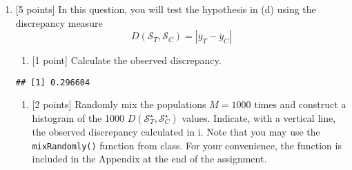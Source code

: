 \documentclass[
]{article}
\newenvironment{Shaded}{\begin{snugshade}}{\end{snugshade}}
\newcommand{\FunctionTok}[1]{\textcolor[rgb]{0.13,0.29,0.53}{\textbf{#1}}}
\newcommand{\NormalTok}[1]{#1}
\newcommand{\OtherTok}[1]{\textcolor[rgb]{0.56,0.35,0.01}{#1}}
\newcommand{\SpecialCharTok}[1]{\textcolor[rgb]{0.81,0.36,0.00}{\textbf{#1}}}
\newcommand{\StringTok}[1]{\textcolor[rgb]{0.31,0.60,0.02}{#1}}
\providecommand{\tightlist}{%
  \setlength{\itemsep}{0pt}\setlength{\parskip}{0pt}}
\begin{document}
\begin{enumerate}
\def\labelenumi{(\alph{enumi})}
\setcounter{enumi}{4}
\item
  {[}5 points{]} In this question, you will test the hypothesis in (d)
  using the discrepancy measure
  \[D(\mathcal{S}_{T},\mathcal{S}_{C}) = |\overline{y}_T - \overline{y}_C|\]

  \begin{enumerate}
  \def\labelenumii{\roman{enumii}.}
  \tightlist
  \item
    {[}1 point{]} Calculate the observed discrepancy.
  \end{enumerate}

\begin{Shaded}
\end{Shaded}

\begin{verbatim}
## [1] 0.296604
\end{verbatim}

  \begin{enumerate}
  \def\labelenumii{\roman{enumii}.}
  \setcounter{enumii}{1}
  \tightlist
  \item
    {[}2 points{]} Randomly mix the populations \(M=1000\) times and
    construct a histogram of the 1000
    \(D(\mathcal{S}_{T}^\star,\mathcal{S}_{C}^\star)\) values. Indicate,
    with a vertical line, the observed discrepancy calculated in i. Note
    that you may use the \texttt{mixRandomly()} function from class. For
    your convenience, the function is included in the Appendix at the
    end of the assignment.
  \end{enumerate}
\end{enumerate}
\end{document}
